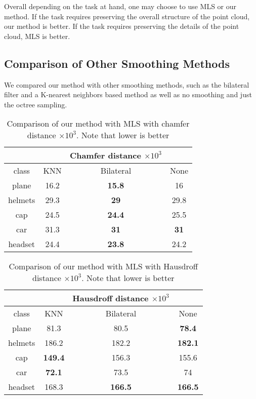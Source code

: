 Overall depending on the task at hand, one may choose to use MLS or our method. If the task requires preserving the overall structure of the point cloud, our method is better. If the task requires preserving the details of the point cloud, MLS is better.

\subsection{Comparison of Other Smoothing Methods}

We compared our method with other smoothing methods, such as the bilateral filter and a K-nearest neighbors based method as well as no smoothing and just the octree sampling.

\begin{table}[H]
\centering
\begin{tabular}{cccc}
	&  & Chamfer distance $\times 10^3$ &\\
	\hline
	class & KNN & Bilateral & None\\
	\hline
	plane & {16.2} & \textbf{15.8} & {16} \\ 
	helmets & {29.3} & \textbf{29} & {29.8} \\
	cap & {24.5} & \textbf{24.4} & {25.5}\\  
	car & {31.3} & \textbf{31} & \textbf{31}\\  
	headset & {24.4} & \textbf{23.8} & {24.2} \\
\end{tabular}
\caption{Comparison of our method with MLS with chamfer distance $\times 10^3$. Note that lower is better}
\end{table}

\begin{table}[H]
\centering
\begin{tabular}{cccc}
	&  & Hausdroff distance $\times 10^3$ &\\
	\hline
	class & KNN & Bilateral & None\\
	\hline
	plane & 81.3 & {80.5} & \textbf{78.4} \\ 
	helmets & 186.2 &  {182.2} & \textbf{182.1}\\
	cap & \textbf{149.4} & {156.3} & {155.6}\\ 
	car & \textbf{72.1} & {73.5} & {74}\\  
	headset & 168.3 & \textbf{166.5} & \textbf{166.5}\\
\end{tabular}
\caption{Comparison of our method with MLS with Hausdroff distance $\times 10^3$. Note that lower is better}
\end{table}

